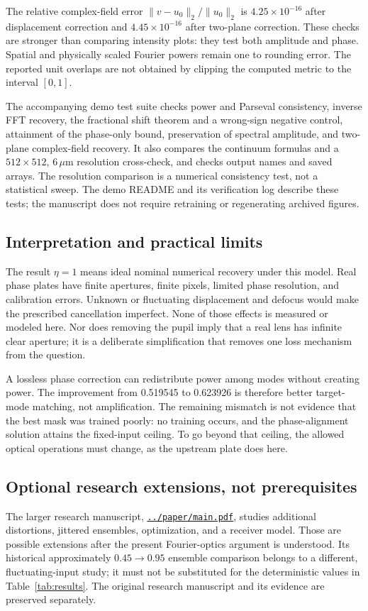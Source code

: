 \documentclass[10pt,a4paper]{article}
\begin{document}
The relative complex-field error $\|v-u_0\|_2/\|u_0\|_2$ is $4.25\times10^{-16}$ after displacement correction and $4.45\times10^{-16}$ after two-plane correction. These checks are stronger than comparing intensity plots: they test both amplitude and phase. Spatial and physically scaled Fourier powers remain one to rounding error. The reported unit overlaps are not obtained by clipping the computed metric to the interval $[0,1]$.

The accompanying demo test suite checks power and Parseval consistency, inverse FFT recovery, the fractional shift theorem and a wrong-sign negative control, attainment of the phase-only bound, preservation of spectral amplitude, and two-plane complex-field recovery. It also compares the continuum formulas and a $512\times512$, $6\,\mu$m resolution cross-check, and checks output names and saved arrays. The resolution comparison is a numerical consistency test, not a statistical sweep. The demo README and its verification log describe these tests; the manuscript does not require retraining or regenerating archived figures.

\subsection{Interpretation and practical limits}
The result $\eta=1$ means ideal nominal numerical recovery under this model. Real phase plates have finite apertures, finite pixels, limited phase resolution, and calibration errors. Unknown or fluctuating displacement and defocus would make the prescribed cancellation imperfect. None of those effects is measured or modeled here. Nor does removing the pupil imply that a real lens has infinite clear aperture; it is a deliberate simplification that removes one loss mechanism from the question.

A lossless phase correction can redistribute power among modes without creating power. The improvement from 0.519545 to 0.623926 is therefore better target-mode matching, not amplification. The remaining mismatch is not evidence that the best mask was trained poorly: no training occurs, and the phase-alignment solution attains the fixed-input ceiling. To go beyond that ceiling, the allowed optical operations must change, as the upstream plate does here.

\subsection{Optional research extensions, not prerequisites}
The larger research manuscript, \href{../paper/main.pdf}{\texttt{../paper/main.pdf}}, studies additional distortions, jittered ensembles, optimization, and a receiver model. Those are possible extensions after the present Fourier-optics argument is understood. Its historical approximately $0.45\to0.95$ ensemble comparison belongs to a different, fluctuating-input study; it must not be substituted for the deterministic values in Table~\ref{tab:results}. The original research manuscript and its evidence are preserved separately.
\end{document}

